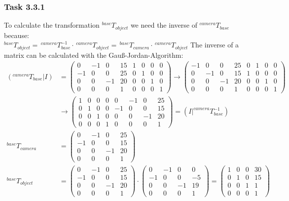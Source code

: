 \subsubsection*{Task 3.3.1}
To calculate the transformation $^{base}T_{object}$ we need the inverse of $^{camera}T_{base}$ because:\\
$^{base}T_{object} =\,^{camera}T_{base}^{-1} \cdot\,^{camera}T_{object} =\,^{base}T_{camera} \cdot\,^{camera}T_{object}$
The inverse of a matrix can be calculated with the Gauß-Jordan-Algorithm:
\begin{align*}
(^{camera}T_{base}|I) &= 
\left(
\begin{array}{cccc|cccc}
0 & -1 & 0 & 15 & 1 & 0 & 0 & 0\\
-1 & 0 & 0 & 25 & 0 & 1 & 0 & 0\\
0 & 0 & -1 & 20 & 0 & 0 & 1 & 0\\
0 & 0 & 0  & 1   & 0 & 0 & 0 & 1
\end{array}
\right)
\rightarrow 
\left(
\begin{array}{cccc|cccc}
-1 & 0 & 0 & 25 & 0 & 1 & 0 & 0\\
0 & -1 & 0 & 15 & 1 & 0 & 0 & 0\\
0 & 0 & -1 & 20 & 0 & 0 & 1 & 0\\
0 & 0 & 0  & 1   & 0 & 0 & 0 & 1
\end{array}
\right)\\
&\rightarrow 
\left(
\begin{array}{cccc|cccc}
1 & 0 & 0 & 0 & 0 & -1 & 0 & 25\\
0 & 1 & 0 & 0 & -1 & 0 & 0 & 15\\
0 & 0 & 1 & 0 & 0 & 0 & -1 & 20\\
0 & 0 & 0  & 1 & 0 & 0 & 0 & 1
\end{array}
\right)
=(I|^{camera}T_{base}^{-1}) 
\\
^{base}T_{camera} &=
\begin{pmatrix}
0 & -1 & 0 & 25\\
-1 & 0 & 0 & 15\\
0 & 0 & -1 & 20\\
0 & 0 & 0 & 1
\end{pmatrix}
\\
^{base}T_{object} &=
\begin{pmatrix}
0 & -1 & 0 & 25\\
-1 & 0 & 0 & 15\\
0 & 0 & -1 & 20\\
0 & 0 & 0 & 1
\end{pmatrix}
\cdot
\begin{pmatrix}
0 & -1 & 0 & 0\\
-1 & 0 & 0 & -5\\
0 & 0 & -1 & 19\\
0 & 0 & 0 & 1
\end{pmatrix}
=
\begin{pmatrix}
1 & 0 & 0 & 30\\
0 & 1 & 0 & 15\\
0 & 0 & 1 & 1\\
0 & 0 & 0 & 1
\end{pmatrix}
\end{align*}

